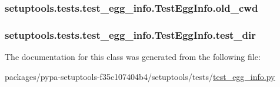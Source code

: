 \subsubsection[{old\+\_\+cwd}]{\setlength{\rightskip}{0pt plus 5cm}setuptools.\+tests.\+test\+\_\+egg\+\_\+info.\+Test\+Egg\+Info.\+old\+\_\+cwd}\label{classsetuptools_1_1tests_1_1test__egg__info_1_1TestEggInfo_aba1f23ba4c1c0b8264ac3d77f1ff7ce9}
\hypertarget{classsetuptools_1_1tests_1_1test__egg__info_1_1TestEggInfo_a7e5f195da2768407a044a5a971a4a576}{}
\subsubsection[{test\+\_\+dir}]{\setlength{\rightskip}{0pt plus 5cm}setuptools.\+tests.\+test\+\_\+egg\+\_\+info.\+Test\+Egg\+Info.\+test\+\_\+dir}\label{classsetuptools_1_1tests_1_1test__egg__info_1_1TestEggInfo_a7e5f195da2768407a044a5a971a4a576}


The documentation for this class was generated from the following file\+:\begin{DoxyCompactItemize}
\item 
packages/pypa-\/setuptools-\/f35c107404b4/setuptools/tests/\hyperlink{test__egg__info_8py}{test\+\_\+egg\+\_\+info.\+py}\end{DoxyCompactItemize}

